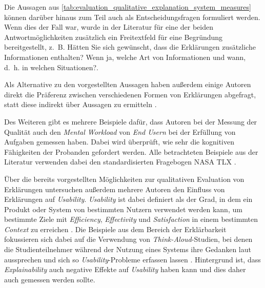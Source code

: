 Die Aussagen aus \autoref{tab:evaluation_qualitative_explanation_system_measures} können darüber hinaus zum Teil auch als Entscheidungsfragen formuliert werden. Wenn dies der Fall war, wurde in der Literatur für eine der beiden Antwortmöglichkeiten zusätzlich ein Freitextfeld für eine Begründung bereitgestellt, z.~B. \glqq Hätten Sie sich gewünscht, dass die Erklärungen zusätzliche Informationen enthalten? Wenn ja, welche Art von Informationen und wann, d.~h. in welchen Situationen?\grqq \cite[übersetzt vgl.][]{riveiro_thats_2021}.

Als Alternative zu den vorgestellten Aussagen haben außerdem einige Autoren direkt die Präferenz zwischen verschiedenen Formen von Erklärungen abgefragt, statt diese indirekt über Aussagen zu ermitteln \cite{kouki_user_2017, mucha_interfaces_2021, abdulrahman_belief-based_2019, balog_measuring_2020, wiegand_id_2020, stange_effects_2021, kaptein_personalised_2017}.

Des Weiteren gibt es mehrere Beispiele dafür, dass Autoren bei der Messung der Qualität auch den \textit{Mental Workload} von \textit{End Usern} bei der Erfüllung von Aufgaben gemessen haben. Dabei wird überprüft, wie sehr die kognitiven Fähigkeiten der Probanden gefordert werden. Alle betrachteten Beispiele aus der Literatur verwenden dabei den standardisierten Fragebogen \glqq NASA TLX\grqq{} \cite{wiegand2019drive, wiegand_id_2020,du2019look}.


Über die bereits vorgestellten Möglichkeiten zur qualitativen Evaluation von Erklärungen untersuchen außerdem mehrere Autoren den Einfluss von Erklärungen auf \textit{Usability}. \textit{Usability} ist dabei definiert als der \glqq Grad, in dem ein Produkt oder System von bestimmten Nutzern verwendet werden kann, um bestimmte Ziele mit \textit{Efficiency}, \textit{Effectivity} und \textit{Satisfaction} in einem bestimmten \textit{Context} zu erreichen \grqq{} \cite[übersetzt vgl.][]{international2011iso}. Die Beispiele aus dem Bereich der Erklärbarkeit fokussieren sich dabei auf die Verwendung von \textit{Think-Aloud}-Studien, bei denen die Studienteilnehmer während der Nutzung eines Systems ihre Gedanken laut aussprechen und sich so \textit{Usability}-Probleme erfassen lassen \cite{wiegand_id_2020, yamada_evaluating_2016}. Hintergrund ist, dass \textit{Explainability} auch negative Effekte auf \textit{Usability} haben kann \cite{chazette_knowledge_nodate} und dies daher auch gemessen werden sollte.

